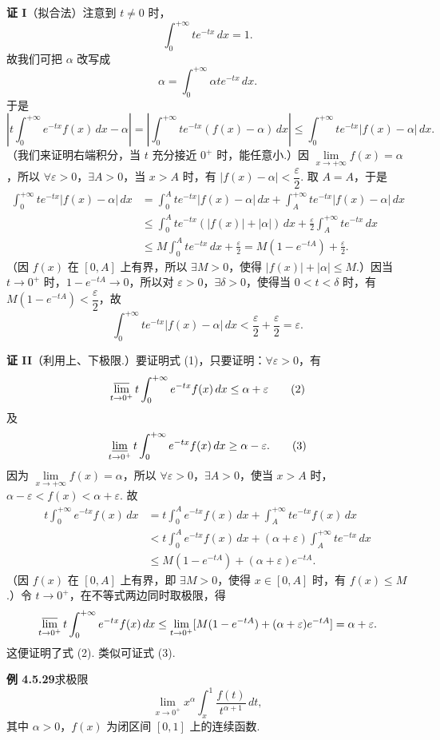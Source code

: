 \documentclass[UTF8, 12pt, fontset=fandol, oneside]{ctexart}
\begin{document}
\noindent\textbf{证 I}\quad （拟合法）注意到 $t\ne0$ 时，
\[
\int_0^{+\infty}te^{-tx}\,dx=1.
\]
故我们可把 $\alpha$ 改写成
\[
\alpha=\int_0^{+\infty}\alpha te^{-tx}\,dx.
\]
于是
\[
\left|t\int_0^{+\infty}e^{-tx}f(x)\,dx-\alpha\right|
=\left|\int_0^{+\infty}te^{-tx}(f(x)-\alpha)\,dx\right|
\le\int_0^{+\infty}te^{-tx}|f(x)-\alpha|\,dx.
\]
（我们来证明右端积分，当 $t$ 充分接近 $0^+$ 时，能任意小.）因 $\lim\limits_{x\to+\infty}f(x)=\alpha$，所以 $\forall\varepsilon>0$，$\exists A>0$，当 $x>A$ 时，有 $|f(x)-\alpha|<\dfrac\varepsilon2$. 取 $A=A$，于是
\[
\begin{aligned}
\int_0^{+\infty}te^{-tx}|f(x)-\alpha|\,dx
&=\int_0^Ate^{-tx}|f(x)-\alpha|\,dx
+\int_A^{+\infty}te^{-tx}|f(x)-\alpha|\,dx\\
&\le\int_0^Ate^{-tx}(|f(x)|+|\alpha|)\,dx
+\frac\varepsilon2\int_A^{+\infty}te^{-tx}\,dx\\
&\le M\int_0^Ate^{-tx}\,dx+\frac\varepsilon2
=M(1-e^{-tA})+\frac\varepsilon2.
\end{aligned}
\]
（因 $f(x)$ 在 $[0,A]$ 上有界，所以 $\exists M>0$，使得 $|f(x)|+|\alpha|\le M$.）因当 $t\to0^+$ 时，$1-e^{-tA}\to0$，所以对 $\varepsilon>0$，$\exists\delta>0$，使得当 $0<t<\delta$ 时，有 $M(1-e^{-tA})<\dfrac\varepsilon2$，故
\[
\int_0^{+\infty}te^{-tx}|f(x)-\alpha|\,dx
<\frac\varepsilon2+\frac\varepsilon2=\varepsilon.
\]

\noindent\textbf{证 II}\quad （利用上、下极限.）要证明式 (1)，只要证明：$\forall\varepsilon>0$，有
\[
\varlimsup_{t\to0^+}t\int_0^{+\infty}e^{-tx}f(x)\,dx\le\alpha+\varepsilon \tag{2}
\]
及
\[
\varliminf_{t\to0^+}t\int_0^{+\infty}e^{-tx}f(x)\,dx\ge\alpha-\varepsilon. \tag{3}
\]
因为 $\lim\limits_{x\to+\infty}f(x)=\alpha$，所以 $\forall\varepsilon>0$，$\exists A>0$，使当 $x>A$ 时，$\alpha-\varepsilon<f(x)<\alpha+\varepsilon$. 故
\[
\begin{aligned}
t\int_0^{+\infty}e^{-tx}f(x)\,dx
&=t\int_0^Ae^{-tx}f(x)\,dx+\int_A^{+\infty}te^{-tx}f(x)\,dx\\
&<t\int_0^Ae^{-tx}f(x)\,dx
+(\alpha+\varepsilon)\int_A^{+\infty}te^{-tx}\,dx\\
&\le M(1-e^{-tA})+(\alpha+\varepsilon)e^{-tA}.
\end{aligned}
\]
（因 $f(x)$ 在 $[0,A]$ 上有界，即 $\exists M>0$，使得 $x\in[0,A]$ 时，有 $f(x)\le M$.）令 $t\to0^+$，在不等式两边同时取极限，得
\[
\varlimsup_{t\to0^+}t\int_0^{+\infty}e^{-tx}f(x)\,dx
\le\lim_{t\to0^+}[M(1-e^{-tA})+(\alpha+\varepsilon)e^{-tA}]
=\alpha+\varepsilon.
\]
这便证明了式 (2). 类似可证式 (3).

\noindent\textbf{例 4.5.29}\quad 求极限
\[
\lim_{x\to0^+}x^\alpha\int_x^1\frac{f(t)}{t^{\alpha+1}}\,dt,
\]
其中 $\alpha>0$，$f(x)$ 为闭区间 $[0,1]$ 上的连续函数.
\end{document}
